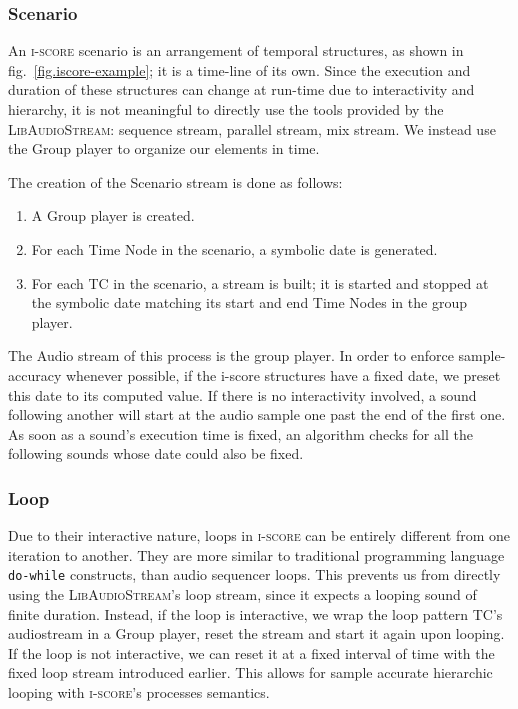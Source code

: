\documentclass{article}
\newcommand*{\LibAudioStream}{\textsc{LibAudioStream}\xspace}
\newcommand*{\iscore}{\textsc{i-score}\xspace}
\newcommand*{\timeconstraint}{\ac{TC}\xspace}
\begin{document}
\subsubsection{Scenario}
An \iscore scenario is an arrangement of temporal structures, as shown in fig.~\ref{fig.iscore-example}; it is a time-line of its own.
Since the execution and duration of these structures can change at run-time due to interactivity and hierarchy, it is not meaningful to directly use the tools provided by the \LibAudioStream: sequence stream, parallel stream, mix stream.
We instead use the Group player to organize our elements in time.

The creation of the Scenario stream is done as follows: 
\begin{enumerate}
	\item A Group player is created.
	\item For each Time Node in the scenario, a symbolic date is generated.
	\item For each \timeconstraint in the scenario, a stream is built; it is started and stopped at the symbolic date matching its start and end Time Nodes in the group player.
\end{enumerate}

The Audio stream of this process is the group player.
In order to enforce sample-accuracy whenever possible, if the i-score structures have a fixed date, we preset this date to its computed value.
If there is no interactivity involved, a sound following another will start at the audio sample one past the end of the first one. 
As soon as a sound's execution time is fixed, an algorithm checks for all the following sounds whose date could also be fixed.

\subsubsection{Loop}
Due to their interactive nature, loops in \iscore can be entirely different from 
one iteration to another. 
They are more similar to traditional programming language \texttt{do-while} constructs, than audio sequencer loops.
This prevents us from directly using the \LibAudioStream's loop stream, since it expects a looping sound of finite duration.
Instead, if the loop is interactive, we wrap the loop pattern \timeconstraint's audiostream in a Group player, reset the stream and start it again upon looping.
If the loop is not interactive, we can reset it at a fixed interval of time with the fixed loop stream introduced earlier.
This allows for sample accurate hierarchic looping with \iscore's processes semantics.
\end{document}
